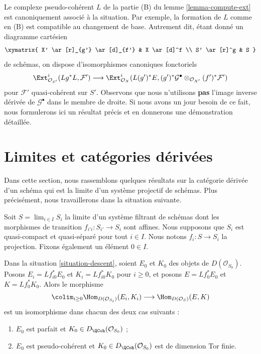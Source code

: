 \begin{remark}
\label{remark-base-change-of-L}
Le complexe pseudo-cohérent $L$ de la partie (B) du lemme \ref{lemma-compute-ext}
est canoniquement associé à la situation. Par exemple,
la formation de $L$ comme en (B) est compatible au changement de base.
Autrement dit, étant donné un diagramme cartésien
$$
\xymatrix{
X' \ar[r]_{g'} \ar[d]_{f'} &
X \ar[d]^f \\
S' \ar[r]^g &
S
}
$$
de schémas, on dispose d'isomorphismes canoniques fonctoriels
$$
\Ext^i_{\mathcal{O}_{S'}}(Lg^*L, \mathcal{F}') \longrightarrow
\Ext^i_{\mathcal{O}_X}(L(g')^*E,
(g')^*\mathcal{G}^\bullet \otimes_{\mathcal{O}_{X'}} (f')^*\mathcal{F}')
$$
pour $\mathcal{F}'$ quasi-cohérent sur $S'$. Observons que nous n'utilisons {\bf pas}
l'image inverse dérivée de $\mathcal{G}^\bullet$ dans le membre de droite.
Si nous avons un jour besoin de ce fait, nous
formulerons ici un résultat précis et en donnerons une démonstration détaillée.
\end{remark}





\section{Limites et catégories dérivées}
\label{section-limits}

\noindent
Dans cette section, nous rassemblons quelques résultats sur la catégorie dérivée
d'un schéma qui est la limite d'un système projectif de schémas.
Plus précisément, nous travaillerons dans la situation suivante.

\begin{situation}
\label{situation-descent}
Soit $S = \lim_{i \in I} S_i$ la limite d'un système filtrant de schémas
dont les morphismes de transition $f_{i'i} : S_{i'} \to S_i$ sont affines.
Nous supposons que $S_i$ est quasi-compact et quasi-séparé pour tout $i \in I$.
Nous notons $f_i : S \to S_i$ la projection. Fixons également un élément $0 \in I$.
\end{situation}

\begin{lemma}
\label{lemma-descend-homomorphisms}
Dans la situation \ref{situation-descent},
soient $E_0$ et $K_0$ des objets de
$D(\mathcal{O}_{S_0})$.
Posons $E_i = Lf_{i0}^*E_0$ et $K_i = Lf_{i0}^*K_0$ pour $i \geq 0$,
et posons $E = Lf_0^*E_0$ et $K = Lf_0^*K_0$. Alors le morphisme
$$
\colim_{i \geq 0} \Hom_{D(\mathcal{O}_{S_i})}(E_i, K_i)
\longrightarrow
\Hom_{D(\mathcal{O}_S)}(E, K)
$$
est un isomorphisme dans chacun des deux cas suivants :
\begin{enumerate}
\item $E_0$ est parfait et $K_0 \in D_\QCoh(\mathcal{O}_{S_0})$ ;
\item $E_0$ est pseudo-cohérent et
$K_0 \in D_\QCoh(\mathcal{O}_{S_0})$ est de dimension Tor finie.
\end{enumerate}
\end{lemma}

